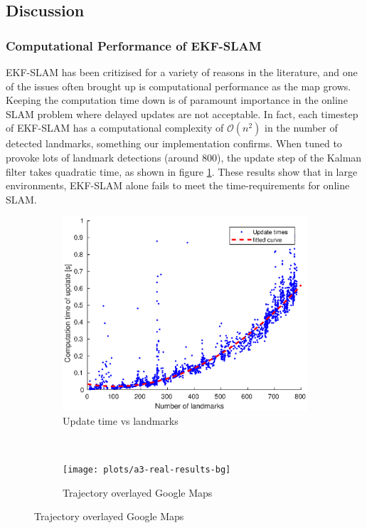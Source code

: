 \subsection{Discussion}
\subsubsection{Computational Performance of EKF-SLAM}
EKF-SLAM has been critizised for a variety of reasons in the literature, and one of the issues often brought up is computational performance as the map grows. Keeping the computation time down is of paramount importance in the online SLAM problem where delayed updates are not acceptable. In fact, each timestep of EKF-SLAM has a computational complexity of $\mathcal{O}(n^2)$ in the number of detected landmarks\cite{divideandconq}, something our implementation confirms. When tuned to provoke lots of landmark detections (around 800), the update step of the Kalman filter takes quadratic time, as shown in figure \ref{fig:update_time_landmarks}. These results show that in large environments, EKF-SLAM alone fails to meet the time-requirements for online SLAM.
\begin{figure}
    \centering
    \begin{subfigure}{0.45\textwidth}
        \includegraphics[width=\textwidth]{plots/a3/update-time-vs-landmarks}
        \caption{Update time vs landmarks}
        \label{fig:update_time_landmarks}
    \end{subfigure}%
~
    \begin{subfigure}{0.45\textwidth}
        \texttt{[image: plots/a3-real-results-bg]}
        \caption{Trajectory overlayed Google Maps}
        \label{fig:results_bg}
    \end{subfigure}
\end{figure}

